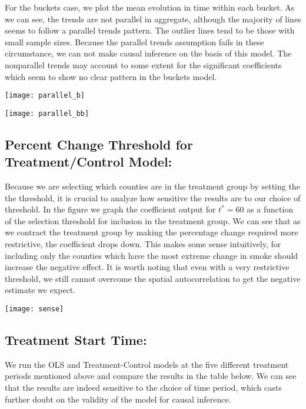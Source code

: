 \documentclass[12pt]{article}
\begin{document}
For the buckets case, we plot the mean evolution in time within each bucket.  As we can see, the trends are not parallel in aggregate, although the majority of lines seems to follow a parallel trends pattern.  The outlier lines tend to be those with small sample sizes.  Because the parallel trends assumption fails in these circumstance, we can not make causal inference on the basis of this model.  The nonparallel trends may account to some extent for the significant coefficients which seem to show no clear pattern in the buckets model.

\texttt{[image: parallel\_b]}

\texttt{[image: parallel\_bb]}

\subsection{Percent Change Threshold for Treatment/Control Model:} Because we are selecting which counties are in the treatment group by setting the the threshold, it is crucial to analyze how sensitive the results are to our choice of threshold. In the figure we graph the coefficient output for $t^* = 60$ as a function of the selection threshold for inclusion in the treatment group.  We can see that as we contract the treatment group by making the percentage change required more restrictive, the coefficient drops down.  This makes some sense intuitively, for including only the counties which have the most extreme change in smoke should increase the negative effect.  It is worth noting that even with a very restrictive threshold, we still cannot overcome the spatial autocorrelation to get the negative estimate we expect.  

\texttt{[image: sense]}

\subsection{Treatment Start Time:} We run the OLS and Treatment-Control models at the five different treatment periods mentioned above and compare the results in the table below. We can see that the results are indeed sensitive to the choice of time period, which casts further doubt on the validity of the model for causal inference.   
\end{document}
